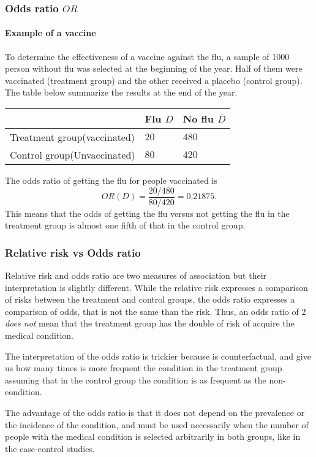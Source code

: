 \begin{frame}
\frametitle{Odds ratio $OR$}
\framesubtitle{Example of a vaccine}
To determine the effectiveness of a vaccine against the flu, a sample of 1000 person without flu was selected at the beginning of the year.
Half of them were vaccinated (treatment group) and the other received a placebo (control group).
The table below summarize the results at the end of the year. 

\begin{center}
  \begin{tabular}{|m{2.7cm}|m{1.5cm}<{\centering}|m{1.5cm}<{\centering}|}
  \cline{2-3}
  \multicolumn{1}{c|}{} & Flu $D$ & No flu $\overline D$\\ 
  \hline
  Treatment group\newline (vaccinated) & $20$ & $480$\\ 
  \hline 
  Control group\newline (Unvaccinated) & $80$ & $420$\\ 
  \hline
\end{tabular}
\end{center}

The odds ratio of getting the flu for people vaccinated is
\[
  OR(D) = \frac{20/480}{80/420} = 0.21875.
\]
This means that the odds of getting the flu versus not getting the flu in the treatment group is almost one fifth of that in the control group.
\end{frame}


\begin{frame}
\frametitle{Relative risk vs Odds ratio} 
Relative risk and odds ratio are two measures of association but their interpretation is slightly different.
While the relative risk expresses a comparison of risks between the treatment and control groups, the odds ratio expresses a comparison of odds, that is not the same than the risk.
Thus, an odds ratio of 2 \emph{does not} mean that the treatment group has the double of risk of acquire the medical condition. 

The interpretation of the odds ratio is trickier because is counterfactual, and give us how many times is more frequent the condition in the treatment group assuming that in the control group the condition is as frequent as the non-condition.

The advantage of the odds ratio is that it does not depend on the prevalence or the incidence of the condition, and must be used necessarily when the number of people with the medical condition is selected arbitrarily in both groups, like in the case-control studies.
\end{frame}


